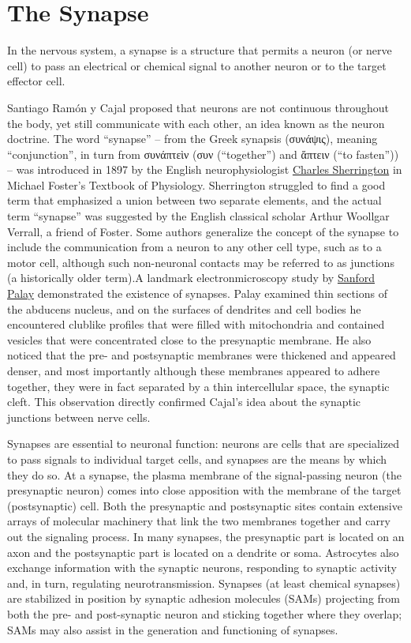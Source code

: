 \hypertarget{the-synapse}{%
\section{The Synapse}\label{the-synapse}}

In the nervous system, a synapse is a structure that permits a neuron (or nerve cell) to pass an electrical or chemical signal to another neuron or to the target effector cell.

Santiago Ramón y Cajal proposed that neurons are not continuous throughout the body, yet still communicate with each other, an idea known as the neuron doctrine. The word ``synapse'' -- from the Greek synapsis (συνάψις), meaning ``conjunction'', in turn from συνάπτεὶν (συν (``together'') and ἅπτειν (``to fasten'')) -- was introduced in 1897 by the English neurophysiologist \href{https://en.wikipedia.org/wiki/Charles_Scott_Sherrington}{Charles Sherrington} in Michael Foster's Textbook of Physiology. Sherrington struggled to find a good term that emphasized a union between two separate elements, and the actual term ``synapse'' was suggested by the English classical scholar Arthur Woollgar Verrall, a friend of Foster. Some authors generalize the concept of the synapse to include the communication from a neuron to any other cell type, such as to a motor cell, although such non-neuronal contacts may be referred to as junctions (a historically older term).A landmark electronmicroscopy study by \href{https://en.wikipedia.org/wiki/Sanford_Palay}{Sanford Palay} demonstrated the existence of synapses. Palay examined thin sections of the abducens nucleus, and on the surfaces of dendrites and cell bodies he encountered clublike profiles that were filled with mitochondria and contained vesicles that were concentrated close to the presynaptic membrane. He also noticed that the pre- and postsynaptic membranes were thickened and appeared denser, and most importantly although these membranes appeared to adhere together, they were in fact separated by a thin intercellular space, the synaptic cleft. This observation directly confirmed Cajal's idea about the synaptic junctions between nerve cells.

Synapses are essential to neuronal function: neurons are cells that are specialized to pass signals to individual target cells, and synapses are the means by which they do so. At a synapse, the plasma membrane of the signal-passing neuron (the presynaptic neuron) comes into close apposition with the membrane of the target (postsynaptic) cell. Both the presynaptic and postsynaptic sites contain extensive arrays of molecular machinery that link the two membranes together and carry out the signaling process. In many synapses, the presynaptic part is located on an axon and the postsynaptic part is located on a dendrite or soma. Astrocytes also exchange information with the synaptic neurons, responding to synaptic activity and, in turn, regulating neurotransmission. Synapses (at least chemical synapses) are stabilized in position by synaptic adhesion molecules (SAMs) projecting from both the pre- and post-synaptic neuron and sticking together where they overlap; SAMs may also assist in the generation and functioning of synapses.



